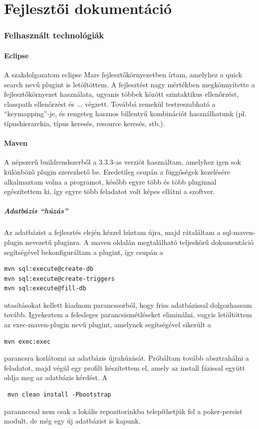 \part{Fejlesztői dokumentáció}

\section{Felhasznált technológiák}

\subsection{Eclipse}
A szakdolgozatom eclipse Mars \cite{eclipse_mars} fejlesztőkörnyezetben írtam, amelyhez a quick search \cite{quick_search} nevű plugint is letöltöttem. A fejlesztést nagy mértékben megkönnyítette a fejlesztőkörnyezet használata, ugyanis többek között szintaktikus ellenőrzést, classpath ellenőrzést és ... végzett. Továbbá remekül testreszabható a ``keymapping''-je, és rengeteg hasznos billentyű kombinációt használhatunk (pl. típushierarchia, típus keresés, resource keresés, stb.).

\subsection{Maven}
A népszerű buildrendszerből a 3.3.3-as verziót használtam, amelyhez igen sok különböző plugin szerezhető be. Eredetileg csupán a függőségek kezelésére alkalmaztam volna a programot, később egyre több és több pluginnal egészítettem ki, így egyre több feladatot volt képes ellátni a szoftver.

\subsubsection{Adatbázis ``húzás''}
Az adatbázist a fejlesztés elején kézzel húztam újra, majd rátaláltam a sql-maven-plugin nevezetű pluginra. A maven oldalán megtalálható teljeskörű dokumentáció segítségével bekonfiguráltam a plugint, így csupán a
 \begin{verbatim}
mvn sql:execute@create-db
mvn sql:execute@create-triggers
mvn sql:execute@fill-db
\end{verbatim}
utasításokat kellett kiadnom parancssorból, hogy friss adatbázissal dolgozhassam tovább. Igyekeztem a felesleges parancsismétléseket eliminálni, vagyis letöltöttem az exec-maven-plugin nevű plugint, amelynek segítségével sikerült a 
 \begin{verbatim}
mvn exec:exec
\end{verbatim}
parancsra korlátozni az adatbázis újrahúzását. Próbáltam tovább absztrahálni a feladatot, majd végül egy profilt készítettem el, amely az install fázissal együtt oldja meg az adatbázis kérdést. A 
 \begin{verbatim}
 mvn clean install -Pbootstrap
 \end{verbatim}
parannccsal nem csak a lokális repozitorinkba telepíthetjük fel a poker-persist modult, de még egy új adatbázist is kapunk.

